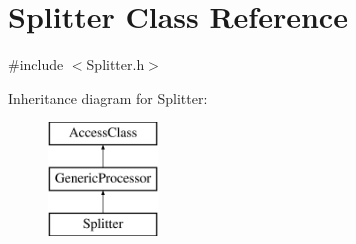 \hypertarget{classSplitter}{\section{Splitter Class Reference}
\label{classSplitter}
}


{\ttfamily \#include $<$Splitter.\-h$>$}

Inheritance diagram for Splitter\-:\begin{figure}[H]
\begin{center}
\leavevmode
\includegraphics[height=3.000000cm]{classSplitter}
\end{center}
\end{figure}
